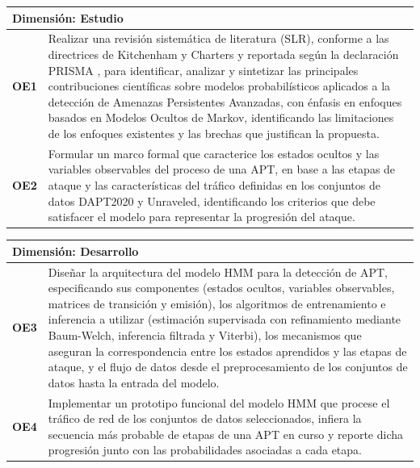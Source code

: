 \begin{center}
    \footnotesize
    \renewcommand{\arraystretch}{1.1}

    \begin{tabularx}{\textwidth}{|c|X|}
    \hline
    \multicolumn{2}{|l|}{\textbf{Dimensión: Estudio}} \\ \hline
    \textbf{OE1} & Realizar una revisión sistemática de literatura (SLR), conforme a las directrices de Kitchenham y Charters \parencite{kitchenham2007guidelines} y reportada según la declaración PRISMA \parencite{page2021prisma}, para identificar, analizar y sintetizar las principales contribuciones científicas sobre modelos probabilísticos aplicados a la detección de Amenazas Persistentes Avanzadas, con énfasis en enfoques basados en Modelos Ocultos de Markov, identificando las limitaciones de los enfoques existentes y las brechas que justifican la propuesta. \\ \hline
    \textbf{OE2} & Formular un marco formal que caracterice los estados ocultos y las variables observables del proceso de una APT, en base a las etapas de ataque y las características del tráfico definidas en los conjuntos de datos DAPT2020 y Unraveled, identificando los criterios que debe satisfacer el modelo para representar la progresión del ataque. \\ \hline
    \end{tabularx}
    \label{tab:obj_estudio}
    
    \vspace{0.2cm}

    \begin{tabularx}{\textwidth}{|c|X|}
    \hline
    \multicolumn{2}{|l|}{\textbf{Dimensión: Desarrollo}} \\ \hline
    \textbf{OE3} & Diseñar la arquitectura del modelo HMM para la detección de APT, especificando sus componentes (estados ocultos, variables observables, matrices de transición y emisión), los algoritmos de entrenamiento e inferencia a utilizar (estimación supervisada con refinamiento mediante Baum-Welch, inferencia filtrada y Viterbi), los mecanismos que aseguran la correspondencia entre los estados aprendidos y las etapas de ataque, y el flujo de datos desde el preprocesamiento de los conjuntos de datos hasta la entrada del modelo. \\ \hline
    \textbf{OE4} & Implementar un prototipo funcional del modelo HMM que procese el tráfico de red de los conjuntos de datos seleccionados, infiera la secuencia más probable de etapas de una APT en curso y reporte dicha progresión junto con las probabilidades asociadas a cada etapa. \\ \hline
    \end{tabularx}
    \label{tab:obj_desarrollo}
    

\end{center}
